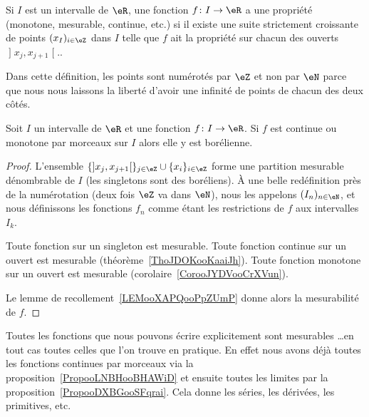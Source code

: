 \begin{definition}
	Si \( I\) est un intervalle de \( \eR\), une fonction \( f\colon I\to \eR\) a une propriété (monotone, mesurable, continue, etc.)  si il existe une suite strictement croissante de points \( (x_I)_{i\in \eZ}\) dans \( I\) telle que \( f\) ait la propriété sur chacun des ouverts \( \mathopen] x_j ,x_{j+1} \mathclose[.\).
\end{definition}
Dans cette définition, les points sont numérotés par \( \eZ\) et non par \( \eN\) parce que nous nous laissons la liberté d'avoir une infinité de points de chacun des deux côtés.

\begin{proposition}     \label{PropooLNBHooBHAWiD}
	Soit \( I\) un intervalle de \( \eR\) et une fonction \( f\colon I\to \eR\). Si \( f\) est continue ou monotone par morceaux sur \( I\) alors elle y est borélienne.
\end{proposition}

\begin{proof}
	L'ensemble \( \{  \mathopen] x_j , x_{j+1} \mathclose[  \}_{j\in \eZ}\cup\{ x_i \}_{i\in \eZ}\) forme une partition mesurable dénombrable de \( I\) (les singletons sont des boréliens). À une belle redéfinition près de la numérotation (deux fois \( \eZ\) va dans \( \eN\)), nous les appelons \( (I_n)_{n\in \eN}\), et nous définissons les fonctions \( f_n\) comme étant les restrictions de \( f\) aux intervalles \( I_k\).

	Toute fonction sur un singleton est mesurable. Toute fonction continue sur un ouvert est mesurable (théorème~\ref{ThoJDOKooKaaiJh}). Toute fonction monotone sur un ouvert est mesurable (corolaire~\ref{CorooJYDVooCrXVun}).

	Le lemme de recollement~\ref{LEMooXAPQooPpZUmP} donne alors la mesurabilité de \( f\).
\end{proof}

\begin{normaltext}
	Toutes les fonctions que nous pouvons écrire explicitement sont mesurables \ldots en tout cas toutes celles que l'on trouve en pratique. En effet nous avons déjà toutes les fonctions continues par morceaux via la proposition~\ref{PropooLNBHooBHAWiD} et ensuite toutes les limites par la proposition~\ref{PropooDXBGooSFqrai}. Cela donne les séries, les dérivées, les primitives, etc.
\end{normaltext}

